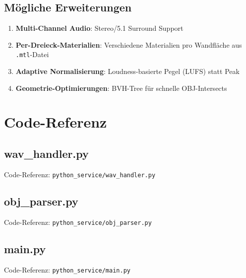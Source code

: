 \documentclass[11pt,a4paper,twoside]{report}
\begin{document}
\section{M\"ogliche Erweiterungen}

\begin{enumerate}
    \item \textbf{Multi-Channel Audio}: Stereo/5.1 Surround Support
    \item \textbf{Per-Dreieck-Materialien}: Verschiedene Materialien pro Wandfl\"ache aus \texttt{.mtl}-Datei
    \item \textbf{Adaptive Normalisierung}: Loudness-basierte Pegel (LUFS) statt Peak
    \item \textbf{Geometrie-Optimierungen}: BVH-Tree f\"ur schnelle OBJ-Intersects
\end{enumerate}

\appendix
\chapter{Code-Referenz}

\section{wav\_handler.py}
Code-Referenz: \texttt{python\_service/wav\_handler.py}

\section{obj\_parser.py}
Code-Referenz: \texttt{python\_service/obj\_parser.py}

\section{main.py}
Code-Referenz: \texttt{python\_service/main.py}
\end{document}
